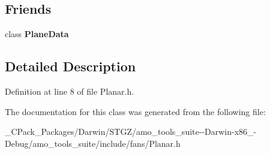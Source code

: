 \subsection*{Friends}
\begin{DoxyCompactItemize}
\item 
\mbox{\label{class_velocity_pressure_traverse_data_a31f6bbdce0894df6a817f493afffda84}} 
class {\bfseries Plane\+Data}
\end{DoxyCompactItemize}


\subsection{Detailed Description}


Definition at line 8 of file Planar.\+h.



The documentation for this class was generated from the following file\+:\begin{DoxyCompactItemize}
\item 
\+\_\+\+C\+Pack\+\_\+\+Packages/\+Darwin/\+S\+T\+G\+Z/amo\+\_\+tools\+\_\+suite-\/-\/\+Darwin-\/x86\+\_-\/\+Debug/amo\+\_\+tools\+\_\+suite/include/fans/Planar.\+h\end{DoxyCompactItemize}

